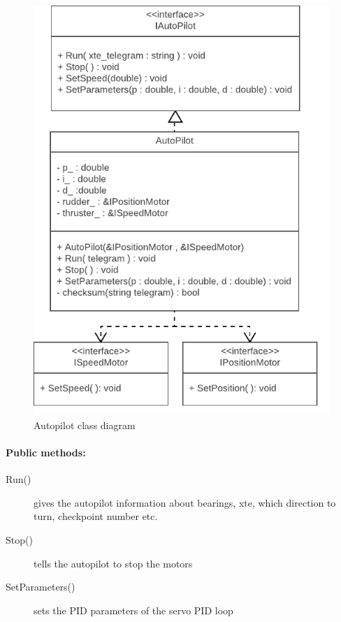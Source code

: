 \begin{figure}[H]
\centering
\includegraphics[width=1\linewidth]{Images/Design/Autopilot_class_diagram}
\caption{Autopilot class diagram}
\label{fig:Autopilot}
\end{figure}

\paragraph{Public methods:}
\begin{adjustwidth}{2.5em}{0pt}\begin{description}
		\item [Run()] gives the autopilot information about bearings, xte, which direction to turn, checkpoint number etc.
		\item [Stop()] tells the autopilot to stop the motors
		\item [SetParameters()] sets the PID parameters of the servo PID loop
\end{description}\end{adjustwidth}

